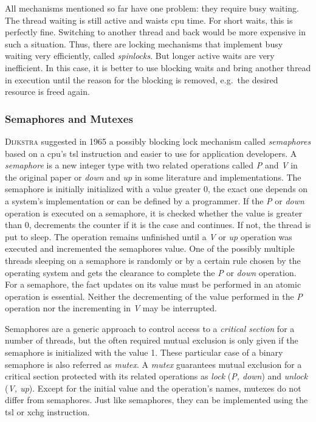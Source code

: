 All mechanisms mentioned so far have one problem: they require busy waiting.
The thread waiting is still active and waists \ac{cpu} time.
For short waits, this is perfectly fine.  
Switching to another thread and back would be more expensive in such a situation\cite{glatz2015betriebssysteme}. 
Thus, there are locking mechanisms that implement busy waiting very efficiently, called \textit{spinlocks}\cite{tanenbaum-modern-operating-systems}.
But longer active waits are very inefficient.
In this case, it is better to use blocking waits and bring another thread in execution until the reason for the blocking is removed, e.g.\ the desired resource is freed again.

\subsubsection*{Semaphores and Mutexes}
\textsc{Dijkstra} suggested in 1965 a possibly blocking lock mechanism called \textit{semaphores} based on a \ac{cpu}'s \ac{tsl} instruction and easier to use for application developers.
A \textit{semaphore} is a new integer type with two related operations called \textit{P} and \textit{V} in the original paper or \textit{down} and \textit{up} in some literature and implementations\cite{glatz2015betriebssysteme}.
The semaphore is initially initialized with a value greater 0, the exact one depends on a system's implementation or can be defined by a programmer.
If the \textit{P} or \textit{down} operation is executed on a semaphore, it is checked whether the value is greater than 0, decrements the counter if it is the case and continues. 
If not, the thread is put to sleep.
The operation remains unfinished until a \textit{V} or \textit{up} operation was executed and incremented the semaphores value.
One of the possibly multiple threads sleeping on a semaphore is randomly or by a certain rule chosen by the operating system and gets the clearance to complete the \textit{P} or \textit{down} operation\cite{tanenbaum-modern-operating-systems}.
For a semaphore, the fact updates on its value must be performed in an atomic operation is essential\cite{silberschatz2009operating}.
Neither the decrementing of the value performed in the \textit{P} operation nor the incrementing in \textit{V} may be interrupted.

Semaphores are a generic approach to control access to a \textit{critical section} for a number of threads, but the often required mutual exclusion is only given if the semaphore is initialized with the value 1.
These particular case of a binary semaphore is also referred as \textit{mutex}.
A \textit{mutex} guarantees mutual exclusion for a critical section protected with its related operations as \textit{lock} (\textit{P, down}) and \textit{unlock} (\textit{V, up})\cite{tanenbaum-modern-operating-systems}.
Except for the initial value and the operation's names, mutexes do not differ from semaphores.
Just like semaphores, they can be implemented using the \ac{tsl} or \ac{xchg} instruction.

